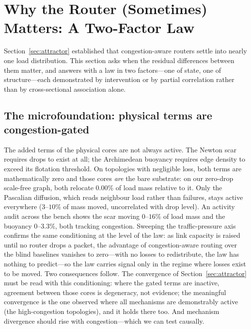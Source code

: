 \section{Why the Router (Sometimes) Matters: A Two-Factor Law}
\label{sec:twofactor}

Section~\ref{sec:attractor} established that congestion-aware routers settle
into nearly one load distribution. This section asks when the residual
differences between them matter, and answers with a law in two factors---one
of state, one of structure---each demonstrated by intervention or by partial
correlation rather than by cross-sectional association alone.

\subsection{The microfoundation: physical terms are congestion-gated}
\label{sec:gating}

The added terms of the physical cores are not always active. The Newton scar
requires drops to exist at all; the Archimedean buoyancy requires edge density
to exceed its flotation threshold. On topologies with negligible loss, both
terms are mathematically zero and those cores \emph{are} the bare substrate:
on our zero-drop scale-free graph, both relocate $0.00\%$ of load mass
relative to it. Only the Pascalian diffusion, which reads neighbour load
rather than failures, stays active everywhere ($3$--$10\%$ of mass moved,
uncorrelated with drop level). An activity audit across the bench shows the
scar moving $0$--$16\%$ of load mass and the buoyancy $0$--$3.3\%$, both
tracking congestion. Sweeping the traffic-pressure axis confirms the same conditioning at the level of the law: as link capacity is raised until no router drops a packet, the advantage of congestion-aware routing over the blind baselines vanishes to zero---with no losses to redistribute, the law has nothing to predict---so the law carries signal only in the regime where losses exist to be moved. Two consequences follow. The convergence of
Section~\ref{sec:attractor} must be read with this conditioning: where the
gated terms are inactive, agreement between those cores is degeneracy, not
evidence; the meaningful convergence is the one observed where all mechanisms
are demonstrably active (the high-congestion topologies), and it holds there
too. And mechanism divergence should rise with congestion---which we can test
causally.

